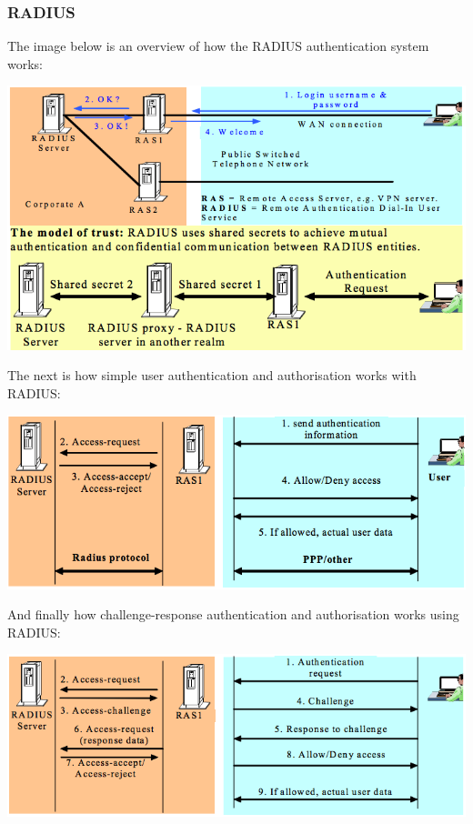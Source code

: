 \documentclass{article}
\begin{document}
\subsubsection{RADIUS}
The image below is an overview of how the RADIUS authentication system works:
\begin{center}
  \includegraphics[scale=0.5]{radius-overview.png}
\end{center}
The next is how simple user authentication and authorisation works with RADIUS:
\begin{center}
  \includegraphics[scale=0.5]{radius-user-auth.png}
\end{center}
And finally how challenge-response authentication and authorisation works using RADIUS:
\begin{center}
  \includegraphics[scale=0.5]{radius-cr-auth.png}
\end{center}
\end{document}
